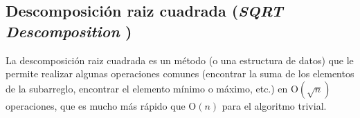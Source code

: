 \subsection{Descomposición raiz cuadrada (\emph{SQRT Descomposition })}

La descomposición raiz cuadrada es un método (o una estructura de datos) que le permite realizar 
algunas operaciones comunes (encontrar la suma de los elementos de la subarreglo, encontrar el 
elemento mínimo o máximo, etc.) en O$(\sqrt n)$ operaciones, que es mucho más rápido que O$(n)$ para el algoritmo trivial.